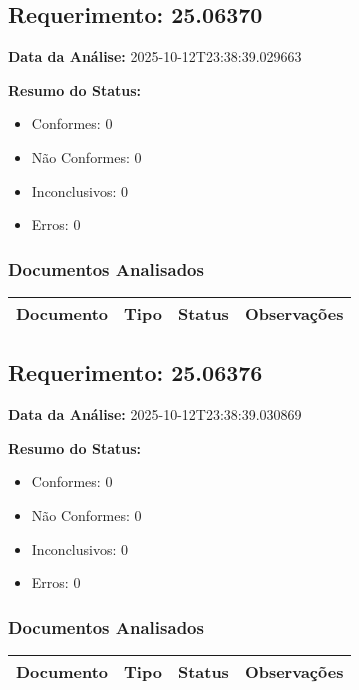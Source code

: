 \documentclass[12pt,a4paper]{article}
\begin{document}
\subsection{Requerimento: 25.06370}

\textbf{Data da Análise:} 2025-10-12T23:38:39.029663

\textbf{Resumo do Status:}
\begin{itemize}
    \item Conformes: 0
    \item Não Conformes: 0
    \item Inconclusivos: 0
    \item Erros: 0
\end{itemize}

\subsubsection{Documentos Analisados}

\begin{longtable}{|p{4cm}|p{2cm}|p{2cm}|p{6cm}|}
\hline
\textbf{Documento} & \textbf{Tipo} & \textbf{Status} & \textbf{Observações} \\
\hline
\endhead
\end{longtable}


\subsection{Requerimento: 25.06376}

\textbf{Data da Análise:} 2025-10-12T23:38:39.030869

\textbf{Resumo do Status:}
\begin{itemize}
    \item Conformes: 0
    \item Não Conformes: 0
    \item Inconclusivos: 0
    \item Erros: 0
\end{itemize}

\subsubsection{Documentos Analisados}

\begin{longtable}{|p{4cm}|p{2cm}|p{2cm}|p{6cm}|}
\hline
\textbf{Documento} & \textbf{Tipo} & \textbf{Status} & \textbf{Observações} \\
\hline
\endhead
\end{longtable}
\end{document}

